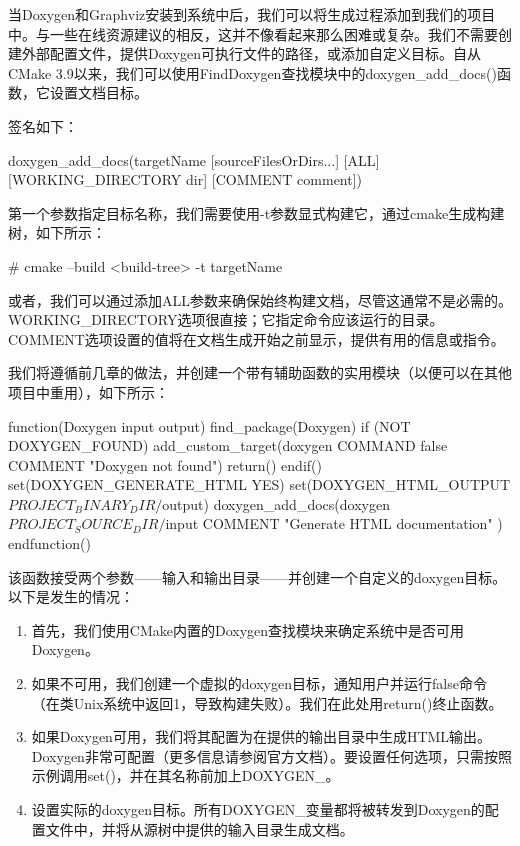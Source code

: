 当Doxygen和Graphviz安装到系统中后，我们可以将生成过程添加到我们的项目中。与一些在线资源建议的相反，这并不像看起来那么困难或复杂。我们不需要创建外部配置文件，提供Doxygen可执行文件的路径，或添加自定义目标。自从CMake 3.9以来，我们可以使用FindDoxygen查找模块中的doxygen\_add\_docs()函数，它设置文档目标。

签名如下：

\begin{shell}
doxygen_add_docs(targetName [sourceFilesOrDirs...]
  [ALL] [WORKING_DIRECTORY dir] [COMMENT comment])
\end{shell}

第一个参数指定目标名称，我们需要使用-t参数显式构建它，通过cmake生成构建树，如下所示：

\begin{shell}
# cmake --build <build-tree> -t targetName
\end{shell}

或者，我们可以通过添加ALL参数来确保始终构建文档，尽管这通常不是必需的。WORKING\_DIRECTORY选项很直接；它指定命令应该运行的目录。COMMENT选项设置的值将在文档生成开始之前显示，提供有用的信息或指令。

我们将遵循前几章的做法，并创建一个带有辅助函数的实用模块（以便可以在其他项目中重用），如下所示：


\begin{cmake}
function(Doxygen input output)
    find_package(Doxygen)
    if (NOT DOXYGEN_FOUND)
        add_custom_target(doxygen COMMAND false
            COMMENT "Doxygen not found")
        return()
    endif()
    set(DOXYGEN_GENERATE_HTML YES)
    set(DOXYGEN_HTML_OUTPUT
        ${PROJECT_BINARY_DIR}/${output})
    doxygen_add_docs(doxygen
        ${PROJECT_SOURCE_DIR}/${input}
        COMMENT "Generate HTML documentation"
    )
endfunction()
\end{cmake}

该函数接受两个参数——输入和输出目录——并创建一个自定义的doxygen目标。以下是发生的情况：

\begin{enumerate}
\item
首先，我们使用CMake内置的Doxygen查找模块来确定系统中是否可用Doxygen。

\item
如果不可用，我们创建一个虚拟的doxygen目标，通知用户并运行false命令（在类Unix系统中返回1，导致构建失败）。我们在此处用return()终止函数。

\item
如果Doxygen可用，我们将其配置为在提供的输出目录中生成HTML输出。Doxygen非常可配置（更多信息请参阅官方文档）。要设置任何选项，只需按照示例调用set()，并在其名称前加上DOXYGEN\_。

\item
设置实际的doxygen目标。所有DOXYGEN\_变量都将被转发到Doxygen的配置文件中，并将从源树中提供的输入目录生成文档。
\end{enumerate}

